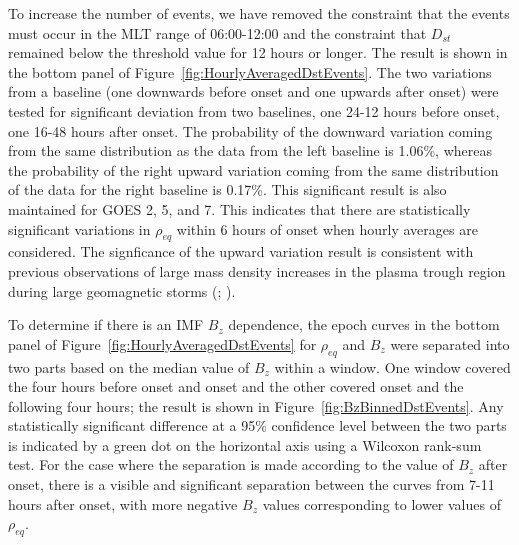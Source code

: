 \documentclass[12pt]{article}
\begin{document}
To increase the number of events, we have removed the constraint that the events must occur in the MLT range of 06:00-12:00 and the constraint that $D_{st}$ remained below the threshold value for 12 hours or longer.  The result is shown in the bottom panel of Figure~\ref{fig:HourlyAveragedDstEvents}. The two variations from a baseline (one downwards before onset and one upwards after onset) were tested for significant deviation from two baselines, one 24-12 hours before onset, one 16-48 hours after onset. The probability of the downward variation coming from the same distribution as the data from the left baseline is 1.06\%, whereas the probability of the right upward variation coming from the same distribution of the data for the right baseline is 0.17\%.  This significant result is also maintained for GOES 2, 5, and 7.  This indicates that there are statistically significant variations in $\rho_{eq}$ within 6 hours of onset when hourly averages are considered.  The signficance of the upward variation result is consistent with previous observations of large mass density increases in the plasma trough region during large geomagnetic storms (\cite{Yao2008}; \cite{Takahashi2010}).  



To determine if there is an IMF $B_{z}$ dependence, the epoch curves in the bottom panel of Figure~\ref{fig:HourlyAveragedDstEvents} for $\rho_{eq}$ and $B_{z}$ were separated into two parts based on the median value of $B_z$ within a window.  One window covered the four hours before onset and onset and the other covered onset and the following four hours; the result is shown in Figure~\ref{fig:BzBinnedDstEvents}. Any statistically significant difference at a 95\% confidence level between the two parts is indicated by a green dot on the horizontal axis using a Wilcoxon rank-sum test. For the case where the separation is made according to the value of $B_{z}$ after onset, there is a visible and significant separation between the curves from 7-11 hours after onset, with more negative $B_z$ values corresponding to lower values of $\rho_{eq}$.
\end{document}
